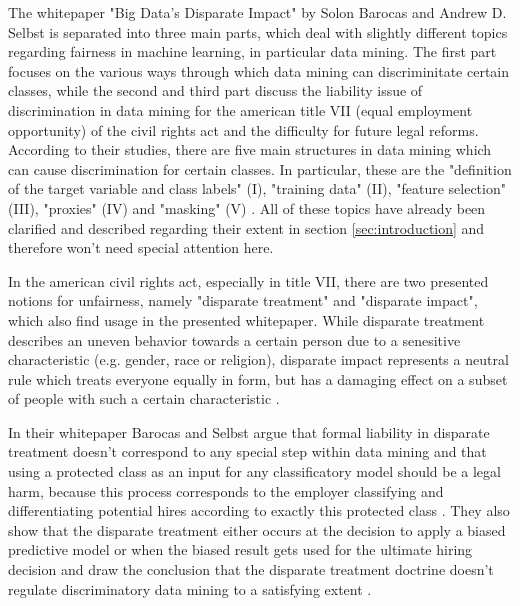 The whitepaper "Big Data’s Disparate Impact" \cite{Barocas.2016} by Solon Barocas and 
Andrew D. Selbst is separated into three main parts, which deal with slightly different 
topics regarding fairness in machine learning, in particular data mining. The first part 
focuses on the various ways through which data mining can discriminitate certain classes, 
while the second and third part discuss the liability issue of discrimination in data 
mining for the american title VII (equal employment opportunity) \cite{titleVII} of the 
civil rights act and the difficulty for future legal reforms.  According to their studies, there are five main structures in data mining which can 
cause discrimination for certain classes. In particular, these are the "definition of 
the target variable and class labels" (I), "training data" (II), "feature selection" (III), 
"proxies" (IV) and "masking" (V) \cite{Barocas.2016}. All of these topics have already 
been clarified and described regarding their extent in section \ref{sec:introduction} and 
therefore won't need special attention here.

In the american civil rights act, especially in title VII, there are two presented notions 
for unfairness, namely "disparate treatment" and "disparate impact", which also find 
usage in the presented whitepaper. While disparate treatment describes an uneven behavior 
towards a certain person due to a senesitive characteristic (e.g. gender, race or 
religion), disparate impact represents a neutral rule which treats everyone equally in 
form, but has a damaging effect on a subset of people with such a certain characteristic \cite{isabel02, isabel01}.

In their whitepaper Barocas and Selbst argue that formal liability in disparate treatment 
doesn't correspond to any special step within data mining and that using a protected 
class as an input for any classificatory model should be a legal harm, because this 
process corresponds to the employer classifying and differentiating potential hires 
according to exactly this protected class \cite{Barocas.2016}. They also show that the 
disparate treatment either occurs at the decision to apply  a biased predictive model 
or when the biased result gets used for the ultimate hiring decision and draw the 
conclusion that the disparate treatment doctrine doesn't regulate discriminatory 
data mining to a satisfying extent \cite{Barocas.2016}. 

